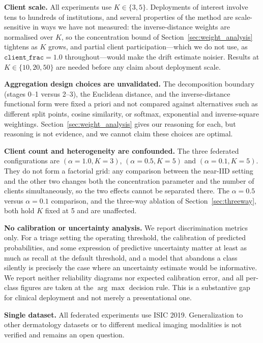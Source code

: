 \documentclass[utf8]{FrontiersinHarvard} %
\begin{document}
\textbf{Client scale.} All experiments use $K \in \{3,5\}$. Deployments of interest involve tens to hundreds of institutions, and several properties of the method are scale-sensitive in ways we have not measured: the inverse-distance weights are normalised over $K$, so the concentration bound of Section~\ref{sec:weight_analysis} tightens as $K$ grows, and partial client participation---which we do not use, as $\texttt{client\_frac}{=}1.0$ throughout---would make the drift estimate noisier. Results at $K \in \{10,20,50\}$ are needed before any claim about deployment scale.

\textbf{Aggregation design choices are unvalidated.} The decomposition boundary (stages 0--1 versus 2--3), the Euclidean distance, and the inverse-distance functional form were fixed a priori and not compared against alternatives such as different split points, cosine similarity, or softmax, exponential and inverse-square weightings. Section~\ref{sec:weight_analysis} gives our reasoning for each, but reasoning is not evidence, and we cannot claim these choices are optimal.

\textbf{Client count and heterogeneity are confounded.} The three federated configurations are $(\alpha{=}1.0, K{=}3)$, $(\alpha{=}0.5, K{=}5)$ and $(\alpha{=}0.1, K{=}5)$. They do not form a factorial grid: any comparison between the near-IID setting and the other two changes both the concentration parameter and the number of clients simultaneously, so the two effects cannot be separated there. The $\alpha{=}0.5$ versus $\alpha{=}0.1$ comparison, and the three-way ablation of Section~\ref{sec:threeway}, both hold $K$ fixed at 5 and are unaffected.

\textbf{No calibration or uncertainty analysis.} We report discrimination metrics only. For a triage setting the operating threshold, the calibration of predicted probabilities, and some expression of predictive uncertainty matter at least as much as recall at the default threshold, and a model that abandons a class silently is precisely the case where an uncertainty estimate would be informative. We report neither reliability diagrams nor expected calibration error, and all per-class figures are taken at the $\arg\max$ decision rule. This is a substantive gap for clinical deployment and not merely a presentational one.

\textbf{Single dataset.} All federated experiments use ISIC 2019. Generalization to other dermatology datasets or to different medical imaging modalities is not verified and remains an open question.
\end{document}
